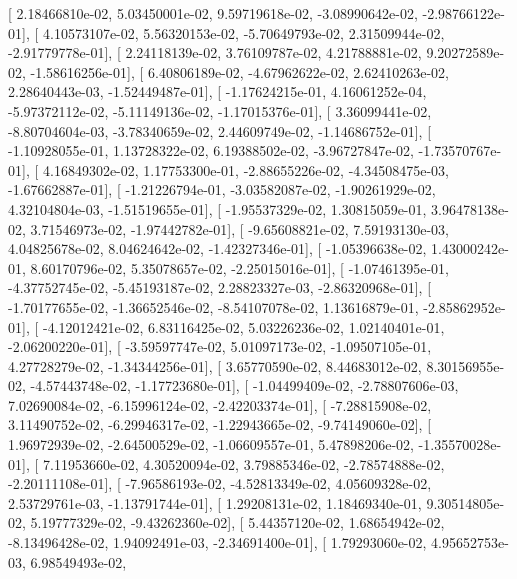\documentclass{article}
\begin{document}
       [  2.18466810e-02,   5.03450001e-02,   9.59719618e-02,
         -3.08990642e-02,  -2.98766122e-01],
       [  4.10573107e-02,   5.56320153e-02,  -5.70649793e-02,
          2.31509944e-02,  -2.91779778e-01],
       [  2.24118139e-02,   3.76109787e-02,   4.21788881e-02,
          9.20272589e-02,  -1.58616256e-01],
       [  6.40806189e-02,  -4.67962622e-02,   2.62410263e-02,
          2.28640443e-03,  -1.52449487e-01],
       [ -1.17624215e-01,   4.16061252e-04,  -5.97372112e-02,
         -5.11149136e-02,  -1.17015376e-01],
       [  3.36099441e-02,  -8.80704604e-03,  -3.78340659e-02,
          2.44609749e-02,  -1.14686752e-01],
       [ -1.10928055e-01,   1.13728322e-02,   6.19388502e-02,
         -3.96727847e-02,  -1.73570767e-01],
       [  4.16849302e-02,   1.17753300e-01,  -2.88655226e-02,
         -4.34508475e-03,  -1.67662887e-01],
       [ -1.21226794e-01,  -3.03582087e-02,  -1.90261929e-02,
          4.32104804e-03,  -1.51519655e-01],
       [ -1.95537329e-02,   1.30815059e-01,   3.96478138e-02,
          3.71546973e-02,  -1.97442782e-01],
       [ -9.65608821e-02,   7.59193130e-03,   4.04825678e-02,
          8.04624642e-02,  -1.42327346e-01],
       [ -1.05396638e-02,   1.43000242e-01,   8.60170796e-02,
          5.35078657e-02,  -2.25015016e-01],
       [ -1.07461395e-01,  -4.37752745e-02,  -5.45193187e-02,
          2.28823327e-03,  -2.86320968e-01],
       [ -1.70177655e-02,  -1.36652546e-02,  -8.54107078e-02,
          1.13616879e-01,  -2.85862952e-01],
       [ -4.12012421e-02,   6.83116425e-02,   5.03226236e-02,
          1.02140401e-01,  -2.06200220e-01],
       [ -3.59597747e-02,   5.01097173e-02,  -1.09507105e-01,
          4.27728279e-02,  -1.34344256e-01],
       [  3.65770590e-02,   8.44683012e-02,   8.30156955e-02,
         -4.57443748e-02,  -1.17723680e-01],
       [ -1.04499409e-02,  -2.78807606e-03,   7.02690084e-02,
         -6.15996124e-02,  -2.42203374e-01],
       [ -7.28815908e-02,   3.11490752e-02,  -6.29946317e-02,
         -1.22943665e-02,  -9.74149060e-02],
       [  1.96972939e-02,  -2.64500529e-02,  -1.06609557e-01,
          5.47898206e-02,  -1.35570028e-01],
       [  7.11953660e-02,   4.30520094e-02,   3.79885346e-02,
         -2.78574888e-02,  -2.20111108e-01],
       [ -7.96586193e-02,  -4.52813349e-02,   4.05609328e-02,
          2.53729761e-03,  -1.13791744e-01],
       [  1.29208131e-02,   1.18469340e-01,   9.30514805e-02,
          5.19777329e-02,  -9.43262360e-02],
       [  5.44357120e-02,   1.68654942e-02,  -8.13496428e-02,
          1.94092491e-03,  -2.34691400e-01],
       [  1.79293060e-02,   4.95652753e-03,   6.98549493e-02,
\end{document}
